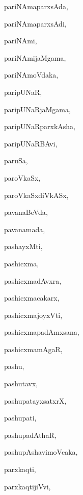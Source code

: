 \begin{multicols}{3}
{\noindent
{pariNAmaparxsAda}, \pageref{pariNAmaparxsAda}

\noindent
{pariNAmaparxsAdi}, \pageref{pariNAmaparxsAdi}

\noindent
{pariNAmi}, \pageref{pariNAmi}

\noindent
{pariNAmijaMgama}, \pageref{pariNAmijaMgama}

\noindent
{pariNAmoVdaka}, \pageref{pariNAmoVdaka}

\noindent
{paripUNaR}, \pageref{paripUNaR}

\noindent
{paripUNaRjaMgama}, \pageref{paripUNaRjaMgama}

\noindent
{paripUNaRparxkAsha}, \pageref{paripUNaRparxkAsha}

\noindent
{paripUNaRBAvi}, \pageref{paripUNaRBAvi}

\noindent
{paruSa}, \pageref{paruSa}

\noindent
{paroVkaSx}, \pageref{paroVkaSx}

\noindent
{paroVkaSxdiVkASx}, \pageref{paroVkaSxdiVkASx}

\noindent
{pavanaBeVda}, \pageref{pavanaBeVda}

\noindent
{pavanamada}, \pageref{pavanamada}

\noindent
{pashayxMti}, \pageref{pashayxMti}

\noindent
{pashicxma}, \pageref{pashicxma}

\noindent
{pashicxmadAvxra}, \pageref{pashicxmadAvxra}

\noindent
{pashicxmacakarx}, \pageref{pashicxmacakarx}

\noindent
{pashicxmajoyxVti}, \pageref{pashicxmajoyxVti}

\noindent
{pashicxmapadAmxsana}, \pageref{pashicxmapadAmxsana}

\noindent
{pashicxmamAgaR}, \pageref{pashicxmamAgaR}

\noindent
{pashu}, \pageref{pashu}

\noindent
{pashutavx}, \pageref{pashutavx}

\noindent
{pashupatayxsatxrX}, \pageref{pashupatayxsatxrX}

\noindent
{pashupati}, \pageref{pashupati}

\noindent
{pashupadAthaR}, \pageref{pashupadAthaR}

\noindent
{pashupAshavimoVcaka}, \pageref{pashupAshavimoVcaka}

\noindent
{parxkaqti}, \pageref{parxkaqti}

\noindent
{parxkaqtijiVvi}, \pageref{parxkaqtijiVvi}

}
\end{multicols}
